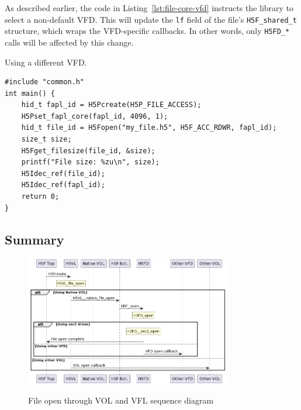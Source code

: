 As described earlier, the code in Listing~\ref{lst:file-core-vfd} instructs the library to select a non-default VFD. This will update the \texttt{lf} field of the file's \texttt{H5F\_shared\_t} structure, which wraps the VFD-specific callbacks. In other words, only \texttt{H5FD\_*} calls will be affected by this change.

\begin{listing}
\centering
\caption{Using a different VFD.}
\label{lst:file-core-vfd}
\begin{verbatim}
#include "common.h"
int main() {
    hid_t fapl_id = H5Pcreate(H5P_FILE_ACCESS);
    H5Pset_fapl_core(fapl_id, 4096, 1);
    hid_t file_id = H5Fopen("my_file.h5", H5F_ACC_RDWR, fapl_id);
    size_t size;
    H5Fget_filesize(file_id, &size);
    printf("File size: %zu\n", size);
    H5Idec_ref(file_id);
    H5Idec_ref(fapl_id);
    return 0;
}
\end{verbatim}
\end{listing}

\subsection{Summary}

\begin{figure}
\centering
\includegraphics[width=0.80\textwidth]{images/tour-2-uml-vol.png}
\label{fig:tour-2-uml-vol}
\caption{File open through VOL and VFL sequence diagram}
\end{figure}

